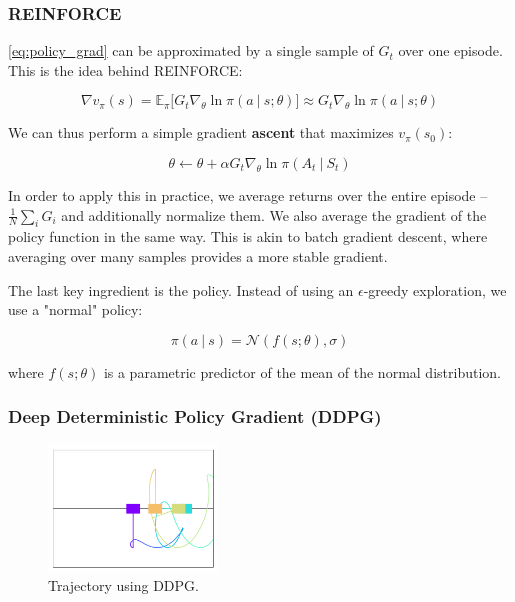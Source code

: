 \documentclass{article}
\newcommand{\giv}{\ |\ }
\begin{document}
    \subsubsection{REINFORCE}


    \autoref{eq:policy_grad} can be approximated by a single sample of $G_t$ over one episode. This is the idea behind REINFORCE:

    \begin{equation*}
        \nabla v_\pi(s) = \mathbb{E}_\pi \big[
            G_t \nabla_\theta \ln \pi(a \giv s; \theta)
        \big] \approx 
            G_t \nabla_\theta \ln \pi(a \giv s; \theta)
    \end{equation*}

    We can thus perform a simple gradient \textbf{ascent} that maximizes $v_\pi(s_0)$:

    \begin{equation*}
        \theta \gets \theta + \alpha G_t \nabla_\theta \ln \pi(A_t \giv S_t)
    \end{equation*}

    In order to apply this in practice, we average returns over the entire episode -- $\frac{1}{N} \sum_i G_i$ and additionally normalize them. We also average the gradient of the policy function in the same way. This is akin to batch gradient descent, where averaging over many samples provides a more stable gradient.

    The last key ingredient is the policy. Instead of using an $\epsilon$-greedy exploration, we use a "normal" policy:

    \begin{equation*}
        \pi(a \giv s) = \mathcal{N}(f(s; \theta), \sigma)
    \end{equation*}

    where $f(s; \theta)$ is a parametric predictor of the mean of the normal distribution. 

    \subsubsection{Deep Deterministic Policy Gradient (DDPG)}
    \begin{figure}[t]
        \centering
        \includegraphics[width=0.4\textwidth]{figures/ddpg_trajectory.png}
        \caption{Trajectory using DDPG.}
        \label{fig:ddpg_trajectory}
    \end{figure}
\end{document}
